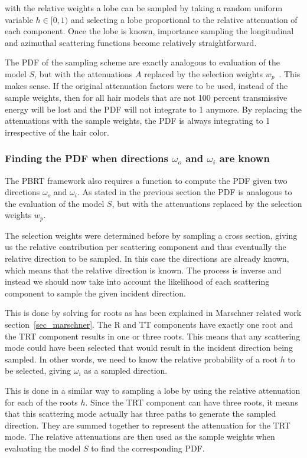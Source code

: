\documentclass[11pt,a4paper]{report}
\begin{document}
with the relative weights a lobe can be sampled by taking a random uniform variable $h \in [0, 1)$ and selecting a lobe proportional to the relative attenuation of each component. Once the lobe is known, importance sampling the longitudinal and azimuthal scattering functions become relatively straightforward.

The PDF of the sampling scheme are exactly analogous to evaluation of the model $S$, but with the attenuations $A$ replaced by the selection weights $w_p$~\cite{eon2013}. This makes sense. If the original attenuation factors were to be used, instead of the sample weights, then for all hair models that are not 100 percent transmissive energy will be lost and the PDF will not integrate to 1 anymore. By replacing the attenuations with the sample weights, the PDF is always integrating to 1 irrespective of the hair color.


\subsubsection{Finding the PDF when directions $\omega_o$ and $\omega_i$ are known}

The PBRT framework also requires a function to compute the PDF given two directions $\omega_o$ and $\omega_i$. As stated in the previous section the PDF is analogous to the evaluation of the model $S$, but with the attenuations replaced by the selection weights $w_p$.

The selection weights were determined before by sampling a cross section, giving us the relative contribution per scattering component and thus eventually the relative direction to be sampled. In this case the directions are already known, which means that the relative direction is known. The process is inverse and instead we should now take into account the likelihood of each scattering component to sample the given incident direction.

This is done by solving for roots as has been explained in Marschner related work section~\ref{sec_marschner}. The R and TT components have exactly one root and the TRT component results in one or three roots. This means that any scattering mode could have been selected that would result in the incident direction being sampled. In other words, we need to know the relative probability of a root $h$ to be selected, giving $\omega_i$ as a sampled direction.

This is done in a similar way to sampling a lobe by using the relative attenuation for each of the roots $h$. Since the TRT component can have three roots, it means that this scattering mode actually has three paths to generate the sampled direction. They are summed together to represent the attenuation for the TRT mode. The relative attenuations are then used as the sample weights when evaluating the model $S$ to find the corresponding PDF.
\end{document}
